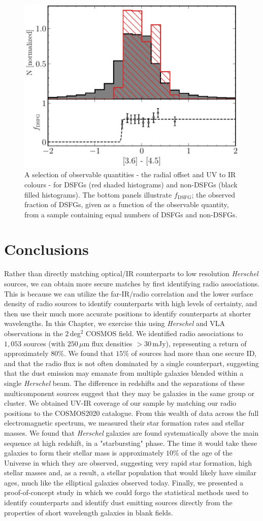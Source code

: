 \begin{figure}
	\includegraphics[width=0.49\columnwidth, height=0.25\textheight]{Figures/3645_smg.pdf}
	\caption[Historgams of DSFGs compared to non-DSFGs in COSMOS]{A selection of observable quantities - the radial offset and UV to IR colours - for DSFGs (red shaded histograms) and non-DSFGs (black filled histograms). The bottom panels illustrate $f_\textrm{DSFG}$; the observed fraction of DSFGs, given as a function of the observable quantity, from a sample containing equal numbers of DSFGs and non-DSFGs.}
	\label{fig:smg_nonsmg}
\end{figure}

\section{Conclusions}

Rather than directly matching optical/IR counterparts to low resolution \textit{Herschel} sources, we can obtain more secure matches by first identifying radio associations. This is because we can utilize the far-IR/radio correlation and the lower surface density of radio sources to identify counterparts with high levels of certainty, and then use their much more accurate positions to identify counterparts at shorter wavelengths. In this Chapter, we exercise this using \textit{Herschel} and VLA observations in the $2\,$deg$^2$ COSMOS field. We identified radio associations to $1,053$ sources (with $250\,\mu$m flux densities $> 30\,$mJy), representing a return of approximately $80\%$. We found that $15\%$ of sources had more than one secure ID, and that the radio flux is not often dominated by a single counterpart, suggesting that the dust emission may emanate from multiple galaxies blended within a single \textit{Herschel} beam. The difference in redshifts and the separations of these multicomponent sources suggest that they may be galaxies in the same group or cluster. We obtained UV-IR coverage of our sample by matching our radio positions to the COSMOS2020 catalogue. From this wealth of data across the full electromagnetic spectrum, we measured their star formation rates and stellar masses. We found that \textit{Herschel} galaxies are found systematically above the main sequence at high redshift, in a "starbursting" phase. The time it would take these galaxies to form their stellar mass is approximately $10\%$ of the age of the Universe in which they are observed, suggesting very rapid star formation, high stellar masses and, as a result, a stellar population that would likely have similar ages, much like the elliptical galaxies observed today. Finally, we presented a proof-of-concept study in which we could forgo the statistical methods used to identify counterparts and identify dust emitting sources directly from the properties of short wavelength galaxies in blank fields.
